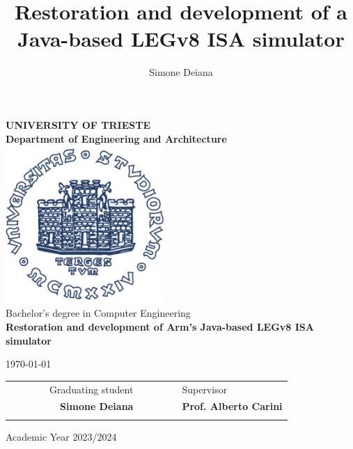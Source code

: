 \title{Restoration and development of a Java-based LEGv8 ISA simulator}
\author{Simone Deiana}

\begin{titlepage}
    \begin{center}
    \BgThispage
    {\LARGE {\bfseries UNIVERSITY OF TRIESTE \\}}
    \vspace{.5cm}
    {\Large {\bfseries Department of Engineering and Architecture \\}}
    \vspace{1cm}
    \includegraphics[width=6cm,height=6cm]{img/units_logo.pdf}\\[1.5cm]

    {\LARGE
        Bachelor's degree in Computer Engineering \\
    }
    \vspace{1cm}
    {\LARGE 
        {\bfseries Restoration and development of Arm's Java-based LEGv8 ISA simulator}
    }
    \vspace{1cm}

    {\large \today \\
    }

    \vfill
    \begin{table}[h]
        {\large
            \begin{tabular}{c c c c r c c | c c l}
                & & & & Graduating student & & & & & Supervisor \\
                & & & & \bfseries Simone Deiana & & & & & \bfseries Prof. Alberto Carini \\ %
                & & & & & & & & & \\
            \end{tabular}
        }
    \end{table}
    Academic Year 2023/2024
    \end{center}
\end{titlepage}
